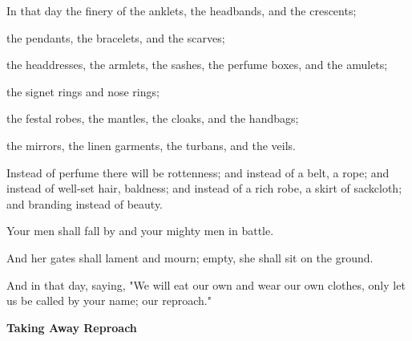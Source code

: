 \documentclass[11pt]{article}
\begin{document}
\begin{biblicaloutline}[Isaiah 3:18-4:1]


\begin{versesection}{2em}
 In that day 
the finery of the anklets, the headbands, and the crescents;

 the pendants, the bracelets, and the scarves;

 the headdresses, the armlets, the sashes,
\poetryline the perfume boxes, and the amulets;

 the signet rings and nose rings;

 the festal robes, the mantles, the cloaks,
\poetryline and the handbags;

 the mirrors, the linen garments,
\poetryline the turbans, and the veils.
\end{versesection}


\begin{versesection}{2em}
 Instead of perfume there will be rottenness;
\poetryline and instead of a belt, a rope;
and instead of well-set hair, baldness;
\poetryline and instead of a rich robe, a skirt of sackcloth;
\poetryline and branding instead of beauty.

 Your men shall fall by 
\poetryline and your mighty men in battle.

 And her gates shall lament and mourn;
\poetryline empty, she shall sit on the ground.
\end{versesection}


\begin{versesection}{2em}
 And  in that day, saying,
"We will eat our own  and wear our own clothes,
\poetryline only let us be called by your name;
\poetryline {} our reproach."
\end{versesection}

\end{biblicaloutline}

\vspace{1em}
{\large\bfseries Taking Away Reproach}
\vspace{1em}
\end{document}
